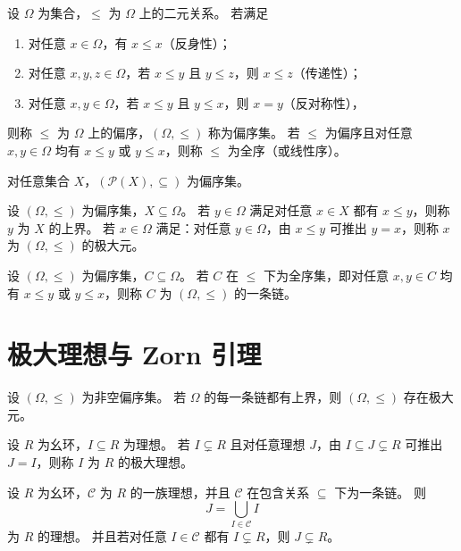 \documentclass[lang=cn,a4paper,newtx]{elegantbook}
\begin{document}
\begin{definition}[偏序与全序]
设 $\Omega$ 为集合，$\le$ 为 $\Omega$ 上的二元关系。
若满足
\begin{enumerate}
\item 对任意 $x\in \Omega$，有 $x\le x$（反身性）；
\item 对任意 $x,y,z\in \Omega$，若 $x\le y$ 且 $y\le z$，则 $x\le z$（传递性）；
\item 对任意 $x,y\in \Omega$，若 $x\le y$ 且 $y\le x$，则 $x=y$（反对称性），
\end{enumerate}
则称 $\le$ 为 $\Omega$ 上的偏序，$(\Omega,\le)$ 称为偏序集。
若 $\le$ 为偏序且对任意 $x,y\in \Omega$ 均有 $x\le y$ 或 $y\le x$，则称 $\le$ 为全序（或线性序）。
\end{definition}

\begin{example}
对任意集合 $X$，$(\mathcal P(X),\subseteq)$ 为偏序集。
\end{example}

\begin{definition}[上界与极大元]
设 $(\Omega,\le)$ 为偏序集，$X\subseteq \Omega$。
若 $y\in \Omega$ 满足对任意 $x\in X$ 都有 $x\le y$，则称 $y$ 为 $X$ 的上界。
若 $x\in \Omega$ 满足：对任意 $y\in \Omega$，由 $x\le y$ 可推出 $y=x$，则称 $x$ 为 $(\Omega,\le)$ 的极大元。
\end{definition}

\begin{definition}[链]
设 $(\Omega,\le)$ 为偏序集，$C\subseteq \Omega$。
若 $C$ 在 $\le$ 下为全序集，即对任意 $x,y\in C$ 均有 $x\le y$ 或 $y\le x$，则称 $C$ 为 $(\Omega,\le)$ 的一条链。
\end{definition}

\section{极大理想与 Zorn 引理}

\begin{lemma}[Zorn 引理]
设 $(\Omega,\le)$ 为非空偏序集。
若 $\Omega$ 的每一条链都有上界，则 $(\Omega,\le)$ 存在极大元。
\end{lemma}

\begin{definition}[极大理想]
设 $R$ 为幺环，$I\subseteq R$ 为理想。
若 $I\subsetneq R$ 且对任意理想 $J$，由 $I\subseteq J\subsetneq R$ 可推出 $J=I$，则称 $I$ 为 $R$ 的极大理想。
\end{definition}

\begin{proposition}\label{chain-union-ideal}
设 $R$ 为幺环，$\mathcal C$ 为 $R$ 的一族理想，并且 $\mathcal C$ 在包含关系 $\subseteq$ 下为一条链。
则
\[
  J=\bigcup_{I\in \mathcal C} I
\]
为 $R$ 的理想。
并且若对任意 $I\in \mathcal C$ 都有 $I\subsetneq R$，则 $J\subsetneq R$。
\end{proposition}
\end{document}
